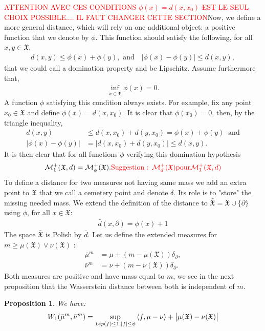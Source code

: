 \documentclass[11pt,a4paper]{article}
\newcommand{\MC}{\mathcal{M}}
\newcommand{\XF}{\mathfrak{X}}
\newcommand{\red}[1]{\textcolor{red}{#1}}
\newcommand{\brac}[1]{\left\langle#1\right\rangle}
\newtheorem{proposition}[theorem]{Proposition}
\begin{document}
\red{ATTENTION AVEC CES CONDITIONS $\phi(x) = d(x,x_0)$ EST LE SEUL CHOIX POSSIBLE.... IL FAUT CHANGER CETTE SECTION}Now, we define a more general distance, which will rely on one additional object: a positive function that we denote by $\phi$. This function should satisfy the following, for all $x,y \in \XF$,
\begin{align*}
    d(x,y) \leq \phi(x) + \phi(y), \text{ and}\quad|\phi(x) - \phi(y)| \leq d(x,y),
\end{align*}
that we could call a domination property and be Lipschitz. Assume furthermore that,
\begin{align*}
    \inf\limits_{x \in \XF} \phi(x) = 0.
\end{align*}
A function $\phi$ satisfying this condition always exists. For example, fix any point $x_0 \in \XF$ and define $\phi(x) = d(x,x_0)$. It is clear that $\phi(x_0) = 0$, then, by the triangle inequality,
\begin{align*}
d(x,y) &\leq d(x,x_0) + d(y,x_0) = \phi(x) + \phi(y)\ \text{ and}\\
|\phi(x) - \phi(y)| &= |d(x,x_0) + d(y,x_0)| \leq d(x,y).
\end{align*}
It is then clear that for all functions $\phi$ verifying this domination hypothesis
\[
\MC^+_1(\XF,d) = \MC^+_{\phi}(\XF). \red{\text{Suggestion : } \MC^+_d(\XF) \text{pour} \MC^+_1(\XF,d)}
\]
To define a distance for two measures not having same mass we add an extra point to $\XF$ that we call a cemetery point and denote $\delta$. Its role is to "store" the missing needed mass. We extend the definition of the distance to $\bar{\XF} = \XF\cup \lbrace\partial\rbrace$ using $\phi$, for all $x \in \XF$:
\begin{align*}
    \bar{d}(x,\partial) = \phi(x) + 1
\end{align*}
The space $\bar{\XF}$ is Polish by $\bar{d}$. Let us define the extended measures for $m\geq \mu(\XF) \vee \nu(\XF)$ :
\begin{align*}
    \bar{\mu}^m &= \mu + (m-\mu(\XF))\delta_{\partial}, \\
    \bar{\nu}^m &= \nu + (m-\nu(\XF))\delta_{\partial}.
\end{align*}
Both measures are positive and have mass equal to $m$, we see in the next proposition that the Wasserstein distance between both is independent of $m$.
\begin{proposition}\label{prop:Kantorovich-general}
    We have:
    \begin{align*}
        W_1(\bar{\mu}^m,\bar{\nu}^m) = \sup\limits_{Lip(f) \leq 1, |f| \leq \phi} \brac{f,\mu - \nu} + \left|\vphantom{A^2}\mu(\XF) - \nu(\XF) \right|
    \end{align*}
\end{proposition}
\end{document}
